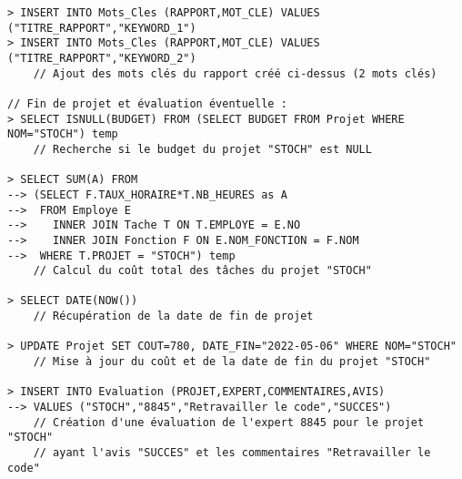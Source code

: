 \begin{verbatim}
> INSERT INTO Mots_Cles (RAPPORT,MOT_CLE) VALUES ("TITRE_RAPPORT","KEYWORD_1")
> INSERT INTO Mots_Cles (RAPPORT,MOT_CLE) VALUES ("TITRE_RAPPORT","KEYWORD_2")
    // Ajout des mots clés du rapport créé ci-dessus (2 mots clés)

// Fin de projet et évaluation éventuelle :
> SELECT ISNULL(BUDGET) FROM (SELECT BUDGET FROM Projet WHERE NOM="STOCH") temp
    // Recherche si le budget du projet "STOCH" est NULL

> SELECT SUM(A) FROM 
--> (SELECT F.TAUX_HORAIRE*T.NB_HEURES as A 
-->  FROM Employe E 
-->    INNER JOIN Tache T ON T.EMPLOYE = E.NO 
-->    INNER JOIN Fonction F ON E.NOM_FONCTION = F.NOM 
-->  WHERE T.PROJET = "STOCH") temp
    // Calcul du coût total des tâches du projet "STOCH"

> SELECT DATE(NOW())
    // Récupération de la date de fin de projet

> UPDATE Projet SET COUT=780, DATE_FIN="2022-05-06" WHERE NOM="STOCH"
    // Mise à jour du coût et de la date de fin du projet "STOCH"

> INSERT INTO Evaluation (PROJET,EXPERT,COMMENTAIRES,AVIS) 
--> VALUES ("STOCH","8845","Retravailler le code","SUCCES")
    // Création d'une évaluation de l'expert 8845 pour le projet "STOCH" 
    // ayant l'avis "SUCCES" et les commentaires "Retravailler le code"
\end{verbatim}

